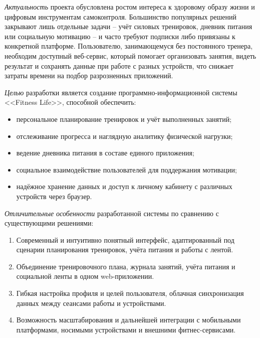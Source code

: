 \emph{Актуальность} проекта обусловлена ростом интереса к здоровому образу жизни и цифровым инструментам самоконтроля. Большинство популярных решений закрывают лишь отдельные задачи -- учёт силовых тренировок, дневник питания или социальную мотивацию -- и часто требуют подписки либо привязаны к конкретной платформе. Пользователю, занимающемуся без постоянного тренера, необходим доступный веб-сервис, который помогает организовать занятия, видеть результат и сохранять данные при работе с разных устройств, что снижает затраты времени на подбор разрозненных приложений.

\emph{Целью} разработки является создание программно-информационной системы <<Fitness Life>>, способной обеспечить:
\begin{itemize}
	\item персональное планирование тренировок и учёт выполненных занятий;
	
	\item отслеживание прогресса и наглядную аналитику физической нагрузки;
	
	\item ведение дневника питания в составе единого приложения;
	
	\item социальное взаимодействие пользователей для поддержания мотивации;
	
	\item надёжное хранение данных и доступ к личному кабинету с различных устройств через браузер.
\end{itemize}

\emph{Отличительные особенности} разработанной системы по сравнению с существующими решениями:
\begin{enumerate}
	\item Современный и интуитивно понятный интерфейс, адаптированный под сценарии планирования тренировок, учёта питания и работы с лентой.
	
	\item Объединение тренировочного плана, журнала занятий, учёта питания и социальной ленты в одном web-приложении.
	
	\item Гибкая настройка профиля и целей пользователя, облачная синхронизация данных между сеансами работы и устройствами.
	
	\item Возможность масштабирования и дальнейшей интеграции с мобильными платформами, носимыми устройствами и внешними фитнес-сервисами.
\end{enumerate}

